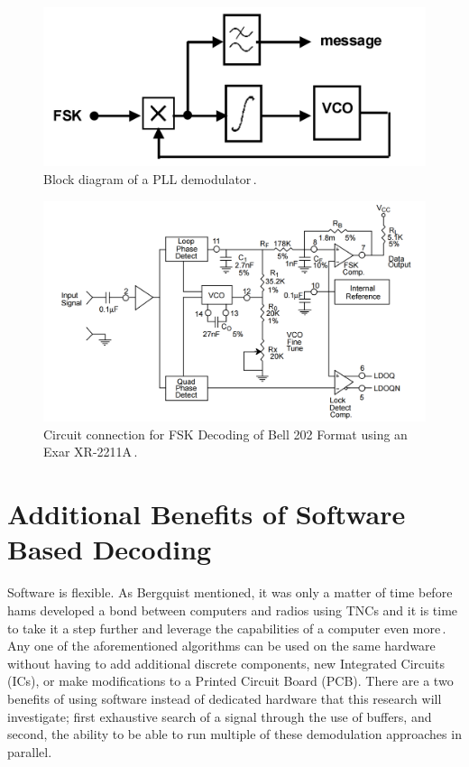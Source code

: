\begin{figure}
  \centering
	\includegraphics[width=0.75\linewidth]{images/PLLBlockDiagram.PNG} 
	\caption{Block diagram of a PLL demodulator\,\cite{Roppel}.}
   \label{PLLBlockDiagram}
\end{figure}
\begin{figure}
  \centering
	\includegraphics[width=0.75\linewidth]{images/XR2211Circuit.PNG} 
	\caption{Circuit connection for FSK Decoding of Bell 202 Format using an Exar XR-2211A\,\cite{EXAR1997}.}
   \label{XR2211Circuit}
\end{figure}

\section{Additional Benefits of Software Based Decoding}
Software is flexible. As Bergquist mentioned, it was only a matter of time before hams developed a bond between computers and radios using TNCs and it is time to take it a step further and leverage the capabilities of a computer even more\,\cite{Bergquist2001}. Any one of the aforementioned algorithms can be used on the same hardware without having to add additional discrete components, new Integrated Circuits (ICs), or make modifications to a Printed Circuit Board (PCB). There are a two benefits of using software instead of dedicated hardware that this research will investigate; first exhaustive search of a signal through the use of buffers, and second, the ability to be able to run multiple of these demodulation approaches in parallel.

